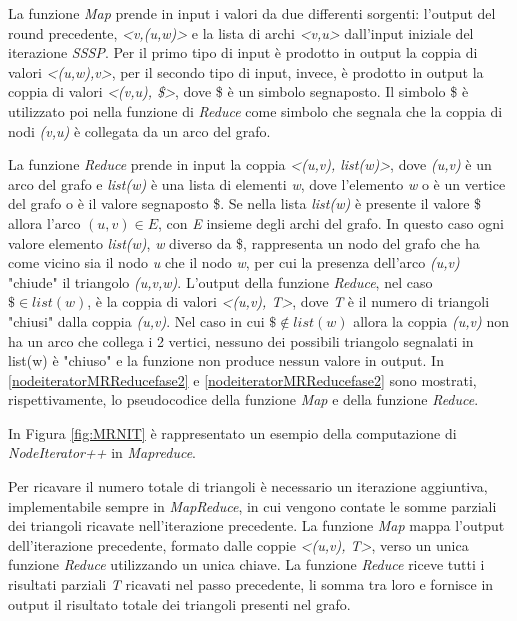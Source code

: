 \documentclass[LaM,binding=0.6cm]{sapthesis}
\begin{document}
La funzione \textit{Map} prende in input i valori da due differenti sorgenti: l'output del round precedente, \textit{<v,(u,w)>} e la lista di archi \textit{<v,u>} dall'input iniziale del iterazione \textit{SSSP}. Per il primo tipo di input è prodotto in output la coppia di valori \textit{<(u,w),v>}, per il secondo tipo di input, invece, è prodotto in output la coppia di valori \textit{<(v,u), \$>}, dove \$ è un simbolo segnaposto. Il simbolo \$ è utilizzato poi nella funzione di \textit{Reduce} come simbolo che segnala che la coppia di nodi \textit{(v,u)} è collegata da un arco del grafo.

La funzione \textit{Reduce} prende in input la coppia \textit{<(u,v), list(w)>}, dove \textit{(u,v)} è un arco del grafo e \textit{list(w)} è una lista di elementi \textit{w}, dove  l'elemento \textit{w} o è un vertice del grafo o è il valore segnaposto \$.
Se nella lista \textit{list(w)} è presente il valore \$ allora l'arco \textit{$(u,v) \in E$}, con \textit{E} insieme degli archi del grafo. In questo caso ogni valore elemento \textit{list(w)}, \textit{w} diverso da \$, rappresenta un nodo del grafo che ha come vicino sia il nodo \textit{u} che il nodo \textit{w}, per cui la presenza dell'arco \textit{(u,v)} "chiude" il triangolo \textit{(u,v,w)}. 
L'output della funzione \textit{Reduce}, nel caso \textit{$\$\in list(w)$}, è la coppia di valori \textit{<(u,v), T>}, dove \textit{T} è il numero di triangoli "chiusi" dalla coppia \textit{(u,v)}. Nel caso in cui \textit{$\$\notin list(w)$} allora la coppia \textit{(u,v)} non ha un arco che collega i 2 vertici, nessuno dei possibili triangolo segnalati in list(w) è "chiuso" e la funzione non produce nessun valore in output.
In \ref{nodeiteratorMRReducefase2} e  \ref{nodeiteratorMRReducefase2} sono mostrati, rispettivamente, lo pseudocodice della funzione \textit{Map} e della funzione \textit{Reduce}.

In Figura \ref{fig:MRNIT} è rappresentato un esempio della computazione di \textit{NodeIterator++} in \textit{Mapreduce}.

Per ricavare il numero totale di triangoli è necessario un iterazione aggiuntiva, implementabile sempre in \textit{MapReduce}, in cui vengono contate le somme parziali dei triangoli ricavate  nell'iterazione precedente. La funzione \textit{Map} mappa l'output dell'iterazione precedente, formato dalle coppie \textit{<(u,v), T>}, verso un unica funzione \textit{Reduce} utilizzando un unica chiave. La funzione \textit{Reduce} riceve tutti i risultati parziali \textit{T} ricavati nel passo precedente, li somma tra loro e fornisce in output il risultato totale dei triangoli presenti nel grafo.
\end{document}

